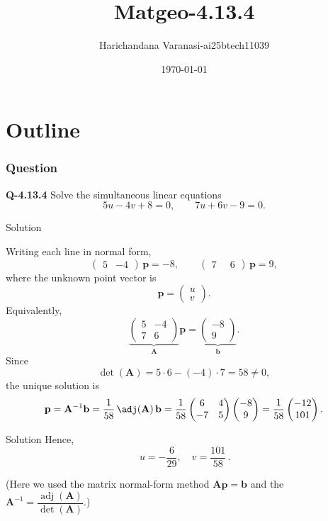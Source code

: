 \documentclass{beamer}
\title{Matgeo-4.13.4}
\author{Harichandana Varanasi-ai25btech11039}
\date{\today}
\theoremstyle{remark}
\newcommand{\myvec}[1]{\ensuremath{\begin{pmatrix}#1\end{pmatrix}}}
\let\vec\mathbf
\begin{document}
\begin{frame}
\titlepage
\end{frame}

\section*{Outline}

\begin{frame}
\frametitle{Question}

\noindent\textbf{Q-4.13.4} \;
Solve the simultaneous linear equations
\[
5u-4v+8=0,\qquad 7u+6v-9=0 .
\]

\end{frame}
\begin{frame}{Solution}
   
\begingroup
\setcounter{equation}{0}
\renewcommand{\theequation}{\arabic{equation}}

Writing each line in normal form,
\begin{equation}
\myvec{5 & -4}\,\vec{p}=-8,\qquad
\myvec{7 & \;\;6}\,\vec{p}=9,
\end{equation}
where the unknown point vector is
\begin{equation}
\vec{p}=\myvec{u\\ v}.
\end{equation}
Equivalently,
\begin{equation}
\underbrace{\myvec{5 & -4\\ 7 & 6}}_{\displaystyle \vec{A}}\vec{p}
=\underbrace{\myvec{-8\\ 9}}_{\displaystyle \vec{b}} .
\end{equation}
Since
\begin{equation}
\det(\vec{A})=5\cdot6-(-4)\cdot7=58\neq 0,
\end{equation}
the unique solution is
\begin{equation}
\vec{p}=\vec{A}^{-1}\vec{b}
=\frac{1}{58}\,\adj(\vec{A})\,\vec{b}
=\frac{1}{58}\myvec{6 & 4\\ -7 & 5}\myvec{-8\\ 9}
=\frac{1}{58}\myvec{-12\\ 101}.
\end{equation}    
\endgroup
\end{frame}
\begin{frame}{Solution}
    \begingroup
Hence,
\begin{equation}
\boxed{\,u=-\dfrac{6}{29},\quad v=\dfrac{101}{58}\, }.
\end{equation}

{\footnotesize
(Here we used the matrix normal-form method $\vec{A}\vec{p}=\vec{b}$ and the
 $\vec{A}^{-1}=\dfrac{\operatorname{adj}(\vec{A})}{\det(\vec{A})}$.)
}

\endgroup
\end{frame}
\end{document}
